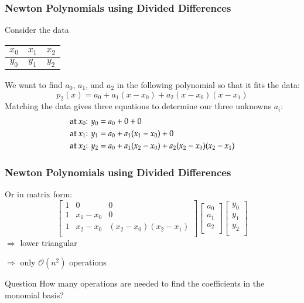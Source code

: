 \documentclass[10pt]{beamer}
\newcommand{\mO}{{\mathcal{O}}}
\begin{document}
\begin{frame}
\frametitle{Newton Polynomials using Divided Differences}
Consider the data
\begin{center}
  \begin{tabular}{c | c | c}
  $x_0$ & $x_1$ & $x_2$\\\hline
  $y_0$ & $y_1$ & $y_2$\\
  \end{tabular}
\end{center}
We want to find $a_0$, $a_1$, and $a_2$ in the following polynomial so that
it fits the data:
\begin{equation*}
  p_2(x) = a_0  + a_1(x-x_0) + a_2(x-x_0)(x-x_1)
\end{equation*}
Matching the data gives three equations to determine our three unknowns
$a_i$:
\begin{align*}
  \text{at $x_0$:\,\,} y_0 & = a_0 + 0 + 0\\
  \text{at $x_1$:\,\,} y_1 & = a_0 + a_1(x_1-x_0) + 0\\
  \text{at $x_2$:\,\,} y_2 & = a_0 + a_1(x_2-x_0) + a_2(x_2-x_0)(x_2-x_1)\\
\end{align*}

\end{frame}
\begin{frame}
\frametitle{Newton Polynomials using Divided Differences}
Or in matrix form:
\begin{equation*}
  \begin{bmatrix}
    1 & 0 & 0\\
    1 & x_1 - x_0 & 0\\
    1 & x_2 - x_0 & (x_2-x_0)(x_2-x_1)\\
  \end{bmatrix}
  \begin{bmatrix}
    a_0\\ a_1\\ a_2\\
  \end{bmatrix}
  \begin{bmatrix}
    y_0\\ y_1\\ y_2\\
  \end{bmatrix}
\end{equation*}
$\Rightarrow$ lower triangular

$\Rightarrow$ only $\mO(n^2)$ operations

\begin{block}{Question}
How many operations are needed to find the coefficients in the
monomial basis?
\end{block}
\end{frame}
\end{document}
